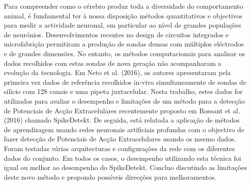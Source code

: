\begin{resumo}
Para compreender como o cérebro produz toda a diversidade do comportamento animal, é fundamental ter à nossa disposição métodos quantitativos e objectivos para medir a actividade neuronal, em particular ao nível de grandes populações de neurónios. Desenvolvimentos recentes no design de circuitos integrados e microfabrição permitiram a produção de sondas densas com múltiplos eléctrodos e de grandes dimensões. No entanto, os métodos computacionais para analisar os dados recolhidos com estas sondas de nova geração não acompanharam a evolução da tecnologia. Em Neto et al. (2016), os autores apresentaram pela primeira vez dados de referência recolhidos in-vivo simultaneamente de sondas de silício com 128 canais e uma pipeta juxtacelular. Nesta trabalho, estes dados for utilizados para avaliar o desempenho e limitações de um método para a detecção de Potenciais de Acção Extracelulares recentemente proposto em Rossant et al. (2016) chamado SpikeDetekt. De seguida, está relatada a aplicação de métodos de aprendizagem usando redes neuronais artificiais profundas com o objectivo de fazer detecção de Potenciais de Acção Extracelulares usando os mesmo dados. Foram testadas várias arquitecturas e configurações da rede com os diferentes dados do conjunto. Em todos os casos, o desempenho utilizando esta técnica foi igual ou melhor ao desempenho do SpikeDetekt. Concluo discutindo as limitações deste novo método e propondo possíveis direcções para melhoramentos.
\end{resumo}
